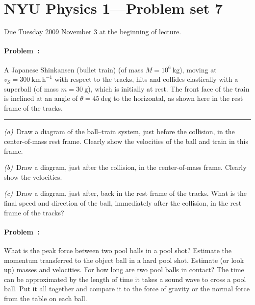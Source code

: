 \documentclass[12pt]{article}
\newcounter{problem}
\begin{document}
\thispagestyle{empty}

\section*{NYU Physics 1---Problem set 7}

Due Tuesday 2009 November 3 at the beginning of lecture.

\paragraph{Problem~\theproblem:}%
A Japanese Shinkansen (bullet train) (of mass $M=10^6~\mathrm{kg}$),
moving at $v_S=300~\mathrm{km\,h^{-1}}$ with respect to the tracks,
hits and collides elastically with a superball (of mass
$m=30~\mathrm{g}$), which is initially at rest.  The front face of the
train is inclined at an angle of $\theta=45~\mathrm{deg}$ to the
horizontal, as shown here in the rest frame of the tracks.\\
\rule{0.1\textwidth}{0pt}

\textsl{(a)}~Draw a diagram of the ball--train system, just before the
collision, in the center-of-mass rest frame.  Clearly show the
velocities of the ball and train in this frame.

\textsl{(b)}~Draw a diagram, just after the collision, in the
center-of-mass frame.  Clearly show the velocities.

\textsl{(c)}~Draw a diagram, just after, back in the rest frame of the
tracks.  What is the final speed and direction of the ball,
immediately after the collision, in the rest frame of the tracks?

\paragraph{Problem~\theproblem:}%
What is the peak force between two pool balls in a pool shot?
Estimate the momentum transferred to the object ball in a hard pool
shot.  Estimate (or look up) masses and velocities.  For how long are
two pool balls in contact?  The time can be approximated by the length
of time it takes a sound wave to cross a pool ball.  Put it all
together and compare it to the force of gravity or the normal force
from the table on each ball.
\end{document}
